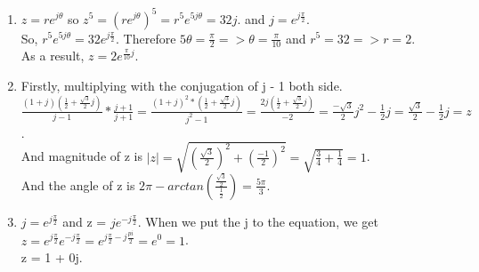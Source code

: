\documentclass[10pt,a4paper, margin=1in]{article}
\begin{document}
\begin{enumerate}
\begin{enumerate}
              \item %
              $z = re^{j\theta}$ so $z^5 = (re^{j\theta})^5 = r^5e^{5j\theta} = 32j$.  and $j = e^{j\frac{\pi}{2}}$. \\

              So, $r^5e^{5j\theta} = 32e^{j\frac{\pi}{2}}$. Therefore $5\theta = \frac{\pi}{2} => \theta = \frac{\pi}{10}$ and $r^5 = 32 => r = 2$.\\

              As a result, $z = 2e^{\frac{\pi}{10}j}$.
              \item %
              Firstly, multiplying with the conjugation of j - 1 both side. \\

              $\frac{(1 + j)(\frac{1}{2} + \frac{\sqrt{3}}{2}j)}{j - 1} * \frac{j + 1}{j + 1} = \frac{(1 + j)^2 * (\frac{1}{2} + \frac{\sqrt{3}}{2}j)}{j^2 - 1} = \frac{2j (\frac{1}{2} + \frac{\sqrt{3}}{2}j)}{-2} = \frac{-\sqrt{3}}{2} j^2 - \frac{1}{2}j = \frac{\sqrt{3}}{2} - \frac{1}{2}j = z$. \\

              And magnitude of z is $|z| = \sqrt{(\frac{\sqrt{3}}{2})^2 + (\frac{-1}{2})^2} = \sqrt{\frac{3}{4} + \frac{1}{4}} = 1$. \\

              And the angle of z is $2\pi - arctan(\frac{\frac{\sqrt{3}}{2}}{\frac{1}{2}}) = \frac{5\pi}{3}$.
              \item %
              $j = e^{j\frac{\pi}{2}}$ and z = $je^{-j\frac{\pi}{2}}$. When we put the j to the equation, we get \\

              $z = e^{j\frac{\pi}{2}} e^{-j\frac{\pi}{2}} = e ^{j\frac{\pi}{2} - j\frac{pi}{2}} = e^0 = 1$. \\

              z = 1 + 0j.
              
          \end{enumerate}


\end{enumerate}
\end{document}
